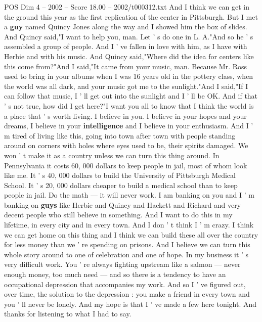 \begin{textsample}{POS Dim 4 – 2002 – Score 18.00 – 2002/t000312.txt}
And I think we can get in the ground this year as the first replication of the center in Pittsburgh.
But I met a \textbf{guy} named Quincy Jones along the way and I showed him the box of slides.
And Quincy said,"I want to help you, man.
Let ' s do one in L.
A."And so he ' s assembled a group of people.
And I ' ve fallen in love with him, as I have with Herbie and with his music.
And Quincy said,"Where did the idea for centers like this come from?"And I said,"It came from your music, man.
Because Mr.
Ross used to bring in your albums when I was 16 years old in the pottery class, when the world was all dark, and your music got me to the sunlight."And I said,"If I can follow that music, I ' ll get out into the sunlight and I ' ll be OK.
And if that ' s not true, how did I get here?"I want you all to know that I think the world is a place that ' s worth living.
I believe in you.
I believe in your hopes and your dreams, I believe in your \textbf{intelligence} and I believe in your enthusiasm.
And I ' m tired of living like this, going into town after town with people standing around on corners with holes where eyes used to be, their spirits damaged.
We won ' t make it as a country unless we can turn this thing around.
In Pennsylvania it costs 60, 000 dollars to keep people in jail, most of whom look like me.
It ' s 40, 000 dollars to build the University of Pittsburgh Medical School.
It ' s 20, 000 dollars cheaper to build a medical school than to keep people in jail.
Do the math — it will never work.
I am banking on you and I ' m banking on \textbf{guys} like Herbie and Quincy and Hackett and Richard and very decent people who still believe in something.
And I want to do this in my lifetime, in every city and in every town.
And I don ' t think I ' m crazy.
I think we can get home on this thing and I think we can build these all over the country for less money than we ' re spending on prisons.
And I believe we can turn this whole story around to one of celebration and one of hope.
In my business it ' s very difficult work.
You ' re always fighting upstream like a salmon — never enough money, too much need — and so there is a tendency to have an occupational depression that accompanies my work.
And so I ' ve figured out, over time, the solution to the depression : you make a friend in every town and you ' ll never be lonely.
And my hope is that I ' ve made a few here tonight.
And thanks for listening to what I had to say.

\end{textsample}
